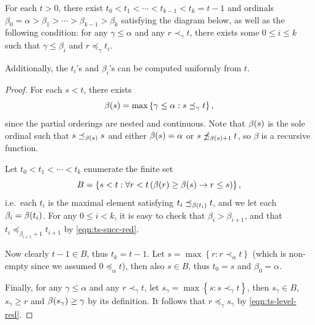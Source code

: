 \documentclass[11pt]{article}
\theoremstyle{plain}
\theoremstyle{definition}
\begin{document}
\begin{lemma}
  \label{lem:ts-index-succ}
  For each $t > 0$, there exist $t_0 < t_1 < \cdots < t_{k - 1} < t_k = t - 1$ and ordinals $\beta_0 = \alpha > \beta_1 > \cdots > \beta_{k - 1} > \beta_k$ satisfying the diagram below, as well as the following condition: for any $\gamma \leq \alpha$ and any $r \prec_\gamma t$, there exists some $0 \leq i \leq k$ such that $\gamma \leq \beta_i$ and $r \preceq_\gamma t_i$.
  \begin{center}
  \end{center}
  Additionally, the $t_i$'s and $\beta_i$'s can be computed uniformly from $t$.
\end{lemma}

\begin{proof}
  For each $s < t$, there exists
  \[\beta\mleft(s\mright) = \max \left\{\gamma \leq \alpha : s \preceq_\gamma t\right\},\]
  since the partial orderings are nested and continuous. Note that $\beta\mleft(s\mright)$ is the sole ordinal such that $s \preceq_{\beta\mleft(s\mright)} s$ and either $\beta\mleft(s\mright) = \alpha$ or $s \npreceq_{\beta\mleft(s\mright) + 1} t$, so $\beta$ is a recursive function.

  Let $t_0 < t_1 < \cdots < t_k$ enumerate the finite set
  \[B = \left\{s < t : \forall r < t \left(\beta\mleft(r\mright) \geq \beta\mleft(s\mright) \rightarrow r \leq s\right)\right\},\]
  i.e.\ each $t_i$ is the maximal element satisfying $t_i \preceq_{\beta\mleft(t_i\mright)} t$, and we let each $\beta_i = \beta\mleft(t_i\mright)$. For any $0 \leq i < k$, it is easy to check that $\beta_i > \beta_{i + 1}$, and that $t_i \preceq_{\beta_{i + 1} + 1} t_{i + 1}$ by \autoref{eqn:ts-succ-red}.

  Now clearly $t - 1 \in B$, thus $t_k = t - 1$. Let $s = \max \left\{r : r \prec_\alpha t\right\}$ (which is non-empty since we assumed $0 \preceq_\alpha t$), then also $s \in B$, thus $t_0 = s$ and $\beta_0 = \alpha$.

  Finally, for any $\gamma \leq \alpha$ and any $r \prec_\gamma t$, let $s_\gamma = \max \left\{s : s \prec_\gamma t\right\}$, then $s_\gamma \in B$, $s_\gamma \geq r$ and $\beta\mleft(s_\gamma\mright) \geq \gamma$ by its definition. It follows that $r \preceq_\gamma s_\gamma$ by \autoref{eqn:ts-level-red}.
\end{proof}
\end{document}
